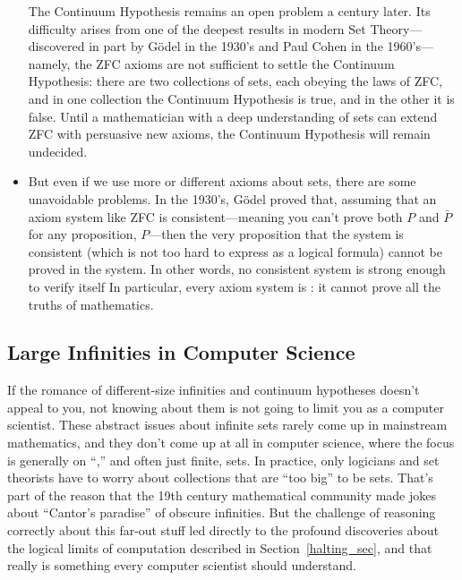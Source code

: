 \begin{itemize}
  The Continuum Hypothesis remains an open problem a century later.
  Its difficulty arises from one of the deepest results in modern Set
  Theory---discovered in part by G\"odel in the 1930's and Paul
  Cohen in the 1960's---namely, the ZFC axioms are not
  sufficient to settle the Continuum Hypothesis: there are two
  collections of sets, each obeying the laws of
  ZFC, and in one collection the
  Continuum Hypothesis is true, and in the other it is false.  Until a
  mathematician with a deep understanding of sets can extend ZFC with
  persuasive new axioms, the Continuum Hypothesis will remain
  undecided.  \iffalse So settling the Continuum Hypothesis some new
  understanding of what Sets should be to arrive at persuasive new
  axioms that extend ZFC and are strong enough to determine the truth
  of the Continuum Hypothesis one way or the other.  \fi
\item But even if we use more or different axioms about sets, there
  are some unavoidable problems.  In the 1930's, G\"odel%
   proved that, assuming that an axiom
  system like ZFC is consistent---meaning you can't prove both $P$ and
  $\bar{P}$ for any proposition, $P$---then the very proposition that
  the system is consistent (which is not too hard to express as a
  logical formula) cannot be proved in the system.  In other words, no
  consistent system is strong enough to verify itself In particular,
  every axiom system is : it cannot prove all the
  truths of mathematics.
  
\end{itemize}

\subsection{Large Infinities in Computer Science}

If the romance of different-size infinities and continuum hypotheses
doesn't appeal to you, not knowing about them is not going to limit
you as a computer scientist.  These abstract issues about infinite
sets rarely come up in mainstream mathematics, and they don't come up
at all in computer science, where the focus is generally on
``,'' and often just finite, sets.  In practice, only
logicians and set theorists have to worry about collections that are
``too big'' to be sets.  That's part of the reason that the 19th
century mathematical community made jokes about ``Cantor's
  paradise'' of obscure infinities.  But the challenge of
reasoning correctly about this far-out stuff led directly to the
profound discoveries about the logical limits of computation described
in Section~\ref{halting_sec}, and that really is something every
computer scientist should understand.


